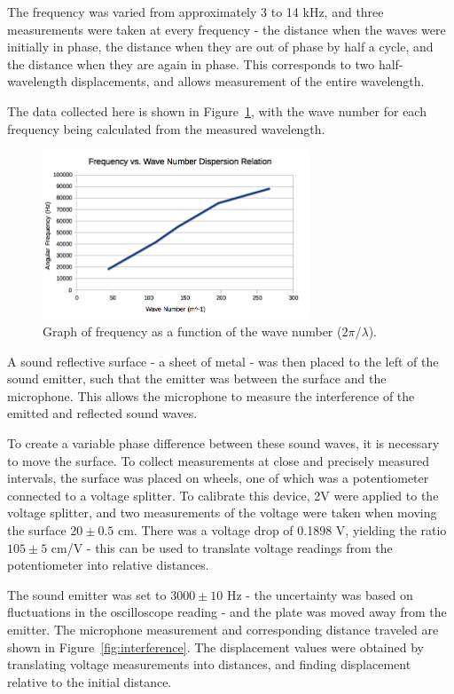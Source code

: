 \documentclass[journal]{IEEEtran}
\begin{document}
The frequency was varied from approximately 3 to 14 kHz, and three measurements
were taken at every frequency - the distance when the waves were initially in
phase, the distance when they are out of phase by half a cycle, and the
distance when they are again in phase. This corresponds to two half-wavelength
displacements, and allows measurement of the entire wavelength.

The data collected here is shown in Figure~\ref{fig:dispersion}, with the wave
number for each frequency being calculated from the measured wavelength.

\begin{figure}[ht!]
\centering
\includegraphics[width=80mm]{dispersion.png}
\caption{Graph of frequency as a function of the wave number ($2 \pi / \lambda$).}
\label{fig:dispersion}
\end{figure}

A sound reflective surface - a sheet of metal - was then placed to the left of
the sound emitter, such that the emitter was between the surface and the
microphone. This allows the microphone to measure the interference of the
emitted and reflected sound waves.

To create a variable phase difference between these sound waves, it is
necessary to move the surface. To collect measurements at close and precisely
measured intervals, the surface was placed on wheels, one of which was a
potentiometer connected to a voltage splitter. To calibrate this device, 2V
were applied to the voltage splitter, and two measurements of the voltage were
taken when moving the surface $20 \pm 0.5$ cm.  There was a voltage drop of
0.1898 V, yielding the ratio $105 \pm 5$ cm/V - this can be used to translate
voltage readings from the potentiometer into relative distances.

The sound emitter was set to $3000 \pm 10$ Hz - the uncertainty was based on
fluctuations in the oscilloscope reading - and the plate was moved away from
the emitter. The microphone measurement and corresponding distance traveled are
shown in Figure~\ref{fig:interference}. The displacement values were obtained
by translating voltage measurements into distances, and finding displacement
relative to the initial distance.
\end{document}
